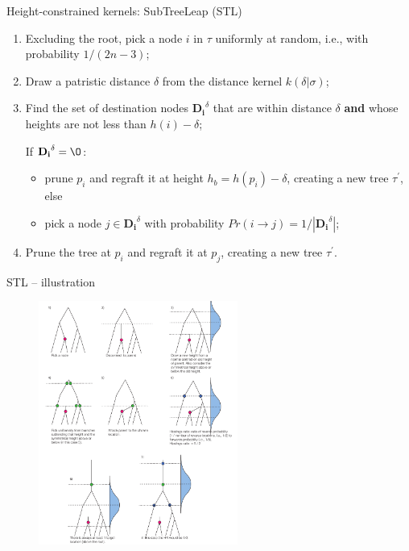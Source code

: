 \documentclass[newPxFont,numfooter,sectionpages]{beamer}
\begin{document}
\begin{frame}{Height-constrained kernels: SubTreeLeap (STL)}

\begin{enumerate}
     \item Excluding the root, pick a node $i$ in  $\tau$ uniformly at random, i.e., with probability $1/(2n-3)$;
     
     \item Draw a patristic distance $\delta$ from the distance kernel $k(\delta | \sigma)$;
     
     \item Find the set of destination nodes $\mathbf{D_i}^\delta $ that are within distance $\delta$ \textbf{and} whose heights are not less than $h(i) - \delta$;
     
      If $\mathbf{D_i}^\delta = \O$:
      \begin{itemize}
       \item prune $p_i$ and regraft it at height $h_{b} =  h(p_i) - \delta$, creating a new tree $\tau^\prime$, else
       \item pick a node $j \in \mathbf{D_i}^\delta $ with probability $Pr(i\to j) = 1/|\mathbf{D_i}^\delta |$;
      \end{itemize}

     \item Prune the tree at $p_i$ and regraft it at $p_j$, creating a new tree $\tau^\prime$. %
     
\end{enumerate}

\end{frame}


\begin{frame}{STL -- illustration}
\begin{figure}
	\includegraphics[width=\textwidth,height=8cm]{figures/STL_kernel.pdf} 
\end{figure}
\end{frame}
\end{document}
